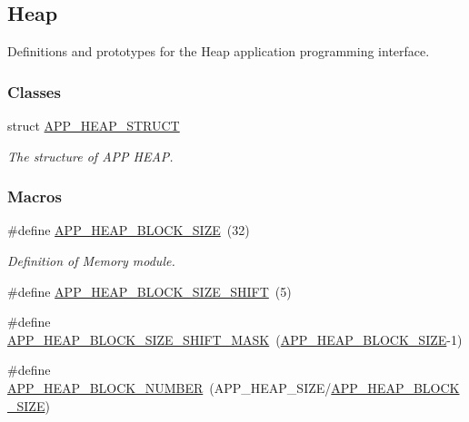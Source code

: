 \hypertarget{group___h_e_a_p}{}\subsection{Heap}
\label{group___h_e_a_p}


Definitions and prototypes for the Heap application programming interface.  


\subsubsection*{Classes}
\begin{DoxyCompactItemize}
\item 
struct \hyperlink{struct_a_p_p___h_e_a_p___s_t_r_u_c_t}{A\+P\+P\+\_\+\+H\+E\+A\+P\+\_\+\+S\+T\+R\+U\+CT}
\begin{DoxyCompactList}\small\item\em The structure of A\+PP H\+E\+AP. \end{DoxyCompactList}\end{DoxyCompactItemize}
\subsubsection*{Macros}
\begin{DoxyCompactItemize}
\item 
\#define \hyperlink{group___h_e_a_p_gab940ae4a9a888cb4b29cdac91e969100}{A\+P\+P\+\_\+\+H\+E\+A\+P\+\_\+\+B\+L\+O\+C\+K\+\_\+\+S\+I\+ZE}~(32)
\begin{DoxyCompactList}\small\item\em Definition of Memory module. \end{DoxyCompactList}\item 
\#define \hyperlink{group___h_e_a_p_gab97877e7b2af2f27dcec19233cd2d7d3}{A\+P\+P\+\_\+\+H\+E\+A\+P\+\_\+\+B\+L\+O\+C\+K\+\_\+\+S\+I\+Z\+E\+\_\+\+S\+H\+I\+FT}~(5)
\item 
\#define \hyperlink{group___h_e_a_p_ga050b0012d8038c0c9b5b8cfe5af842b4}{A\+P\+P\+\_\+\+H\+E\+A\+P\+\_\+\+B\+L\+O\+C\+K\+\_\+\+S\+I\+Z\+E\+\_\+\+S\+H\+I\+F\+T\+\_\+\+M\+A\+SK}~(\hyperlink{group___h_e_a_p_gab940ae4a9a888cb4b29cdac91e969100}{A\+P\+P\+\_\+\+H\+E\+A\+P\+\_\+\+B\+L\+O\+C\+K\+\_\+\+S\+I\+ZE}-\/1)
\item 
\#define \hyperlink{group___h_e_a_p_ga16afa60a5d847e39bd31115ba7009b34}{A\+P\+P\+\_\+\+H\+E\+A\+P\+\_\+\+B\+L\+O\+C\+K\+\_\+\+N\+U\+M\+B\+ER}~(A\+P\+P\+\_\+\+H\+E\+A\+P\+\_\+\+S\+I\+ZE/\hyperlink{group___h_e_a_p_gab940ae4a9a888cb4b29cdac91e969100}{A\+P\+P\+\_\+\+H\+E\+A\+P\+\_\+\+B\+L\+O\+C\+K\+\_\+\+S\+I\+ZE})
\end{DoxyCompactItemize}
